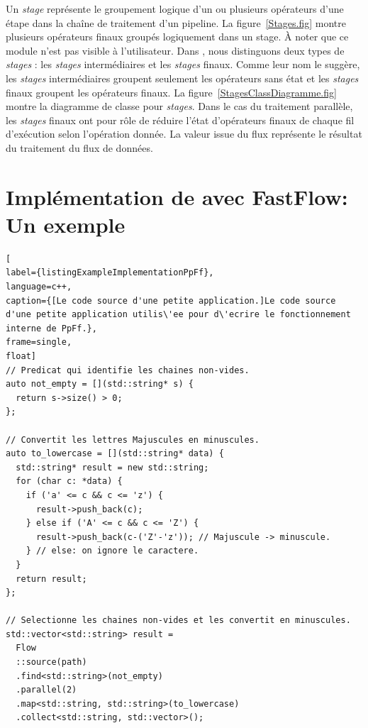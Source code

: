Un \emph{stage} repr\'esente le groupement logique d'un ou plusieurs op\'erateurs d'une \'etape dans la cha\^ine de traitement d'un pipeline. La figure~\ref{Stages.fig} montre plusieurs op\'erateurs finaux group\'es logiquement dans un stage.  \`A noter que ce module n'est pas visible \`a l'utilisateur. Dans , nous distinguons deux types de \emph{stages} : les \emph{stages} interm\'ediaires et les \emph{stages} finaux. Comme leur nom le sugg\`ere, les \emph{stages} interm\'ediaires groupent seulement les op\'erateurs sans \'etat et les \emph{stages} finaux groupent les op\'erateurs finaux. La figure~\ref{StagesClassDiagramme.fig} montre la diagramme de classe pour \emph{stages}. Dans le cas du traitement parall\`ele, les \emph{stages} finaux ont pour r\^ole de r\'eduire l'\'etat d'op\'erateurs finaux de chaque fil d'ex\'ecution selon l'op\'eration donn\'ee. La valeur issue du flux repr\'esente le r\'esultat du traitement du flux de donn\'ees.



\section{Impl\'ementation de  avec FastFlow: Un exemple}

\begin{lstlisting}[
label={listingExampleImplementationPpFf},
language=c++,
caption={[Le code source d'une petite application.]Le code source d'une petite application utilis\'ee pour d\'ecrire le fonctionnement interne de PpFf.},
frame=single,
float]
// Predicat qui identifie les chaines non-vides.
auto not_empty = [](std::string* s) {
  return s->size() > 0;
};
	
// Convertit les lettres Majuscules en minuscules.
auto to_lowercase = [](std::string* data) {
  std::string* result = new std::string;
  for (char c: *data) {
    if ('a' <= c && c <= 'z') {
   	  result->push_back(c);
   	} else if ('A' <= c && c <= 'Z') {
	  result->push_back(c-('Z'-'z')); // Majuscule -> minuscule.
   	} // else: on ignore le caractere.
  }
  return result;	
};

// Selectionne les chaines non-vides et les convertit en minuscules.
std::vector<std::string> result = 
  Flow
  ::source(path)
  .find<std::string>(not_empty)
  .parallel(2)
  .map<std::string, std::string>(to_lowercase)
  .collect<std::string, std::vector>();
\end{lstlisting}




